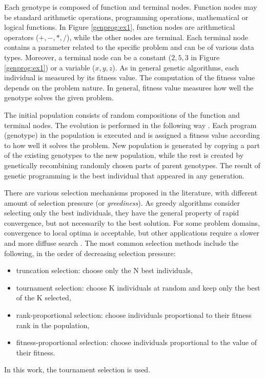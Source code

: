 Each genotype is composed of function and terminal nodes.
Function nodes may be standard arithmetic operations, programming operations, mathematical or logical functions.
In Figure \ref{genprog:ex1}, function nodes are arithmetical operators ($+, -, *, /$), while the other nodes are terminal.
Each terminal node contains a parameter related to the specific problem and can be of various data types.
Moreover, a terminal node can be a constant ($2, 5, 3$ in Figure \ref{genprog:ex1}) or a variable ($x, y, z$).
As in general genetic algorithms, each individual is measured by its fitness value.
The computation of the fitness value depends on the problem nature.
In general, fitness value measures how well the genotype solves the given problem.

The initial population consists of random compositions of the function and terminal nodes.
The evolution is performed in the following way \cite{koza1992genetic}.
Each program (genotype) in the population is executed and is assigned a fitness value according to how well it solves the problem.
New population is generated by copying a part of the existing genotypes to the new population, while the rest is created by genetically recombining randomly chosen parts of parent genotypes.
The result of genetic programming is the best individual that appeared in any generation.

There are various selection mechanisms proposed in the literature, with different amount of selection pressure (or \textit{greediness}).
As greedy algorithms consider selecting only the best individuals, they have the general property of rapid convergence, but not necessarily to the best solution.
For some problem domains, convergence to local optima is acceptable, but other applications require a slower and more diffuse search \cite{rozenberg2012handbook}.
The most common selection methods include the following, in the order of decreasing selection pressure:
\begin{itemize}
	\item truncation selection: choose only the N best individuals,
	\item tournament selection: choose K individuals at random and keep only the best of the K selected,
	\item rank-proportional selection: choose individuals proportional to their fitness rank in the population,
	\item fitness-proportional selection: choose individuals proportional to the value of their fitness.
\end{itemize}
In this work, the tournament selection is used.

